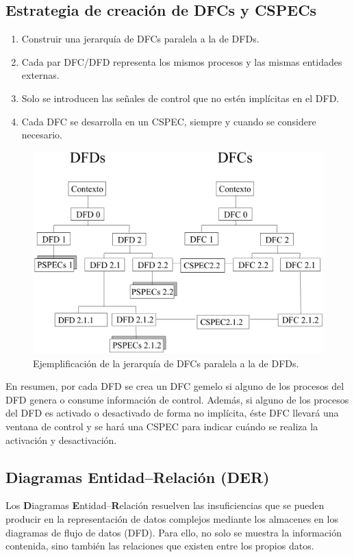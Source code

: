 \subsection{Estrategia de creación de DFCs y CSPECs}

\begin{enumerate}
    \item Construir una jerarquía de DFCs paralela a la de DFDs.
    \item Cada par DFC/DFD representa los mismos procesos y las mismas entidades externas.
    \item Solo se introducen las señales de control que no estén implícitas en el DFD.
    \item Cada DFC se desarrolla en un CSPEC, siempre y cuando se considere necesario.
\end{enumerate}

\begin{figure}[H]
    \centering
    \includegraphics[width=0.8\linewidth]{Resources/Tema5/jerarquiaDFCs.png}
    \caption{Ejemplificación de la jerarquía de DFCs paralela a la de DFDs.}
\end{figure}

En resumen, por cada DFD se crea un DFC gemelo si alguno de los procesos del DFD genera o consume información de control. Además, si alguno de los procesos del DFD es activado o desactivado de forma no implícita, éste DFC llevará una ventana de control y se hará una CSPEC para indicar cuándo se realiza la activación y desactivación.

\subsection{Diagramas Entidad--Relación (DER)}

Los \textbf{D}iagramas \textbf{E}ntidad--\textbf{R}elación resuelven las insuficiencias que se pueden producir en la representación de datos complejos mediante los almacenes en los diagramas de flujo de datos (DFD). Para ello, no solo se muestra la información contenida, sino también las relaciones que existen entre los propios datos.

